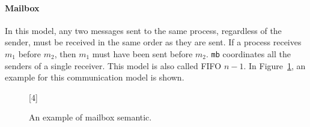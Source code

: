 \paragraph{Mailbox}
In this model, any two messages sent to the same process, regardless of the sender, 
must be received in the same order as they are sent. If a process receives $m_1$ 
before $m_2$, then $m_1$ must have been sent before $m_2$. \verb|mb| coordinates all 
the senders of a single receiver. This model is also called FIFO $n-1$.
In Figure~\ref{fig:mailbox}, an example for this communication model is shown.

\begin{figure}[!ht]
	\centering
	\begin{msc}[draw frame=none, draw head=none, msc keyword=, 
				head height=0px, label distance=0.5ex, 
				foot height=0px, foot distance=0px]{}

		[4]
		\nextlevel
		\nextlevel
		\nextlevel
	\end{msc}
	\caption{An example of mailbox semantic.}
	\label{fig:mailbox}
\end{figure}





